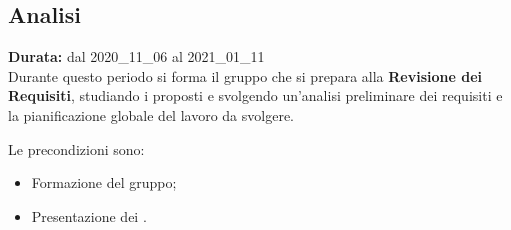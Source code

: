 \subsection{Analisi}
\label{analisi}
\textbf{Durata:} dal 2020\_11\_06 al 2021\_01\_11\\
Durante questo periodo si forma il gruppo che si prepara alla \textbf{Revisione dei Requisiti}, studiando i  proposti e svolgendo un'analisi preliminare dei requisiti e la pianificazione globale del lavoro da svolgere. 

Le precondizioni sono:
\begin{itemize}
    \item Formazione del gruppo;
    \item Presentazione dei .
\end{itemize}

